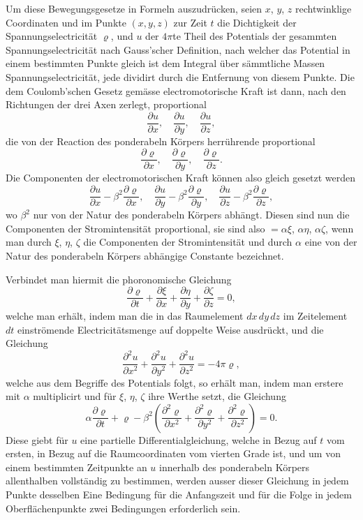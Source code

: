 \documentclass[12pt,a4paper]{article}
\begin{document}
Um diese Bewegungsgesetze in Formeln auszudrücken, seien $x$, $y$, $z$ rechtwinklige Coordinaten und im Punkte $(x, y, z)$ zur Zeit $t$ die Dichtigkeit der Spannungselectricität $\varrho$, und $u$ der $4\pi$te Theil des Potentials der gesammten Spannungselectricität nach Gauss'scher Definition, nach welcher das Potential in einem bestimmten Punkte gleich ist dem Integral über sämmtliche Massen Spannungselectricität, jede dividirt durch die Entfernung von diesem Punkte. Die dem Coulomb'schen Gesetz gemässe electromotorische Kraft ist dann, nach den Richtungen der drei Axen zerlegt, proportional
\[
\frac{\partial u}{\partial x}, \quad \frac{\partial u}{\partial y}, \quad \frac{\partial u}{\partial z},
\]
die von der Reaction des ponderabeln Körpers herrührende proportional
\[
\frac{\partial \varrho}{\partial x}, \quad \frac{\partial \varrho}{\partial y}, \quad \frac{\partial \varrho}{\partial z}.
\]
Die Componenten der electromotorischen Kraft können also gleich gesetzt werden
\[
\frac{\partial u}{\partial x} - \beta^2 \frac{\partial \varrho}{\partial x}, \quad
\frac{\partial u}{\partial y} - \beta^2 \frac{\partial \varrho}{\partial y}, \quad
\frac{\partial u}{\partial z} - \beta^2 \frac{\partial \varrho}{\partial z},
\]
wo $\beta^2$ nur von der Natur des ponderabeln Körpers abhängt. Diesen sind nun die Componenten der Stromintensität proportional, sie sind also $= \alpha \xi$, $\alpha \eta$, $\alpha \zeta$, wenn man durch $\xi$, $\eta$, $\zeta$ die Componenten der Stromintensität und durch $\alpha$ eine von der Natur des ponderabeln Körpers abhängige Constante bezeichnet.

Verbindet man hiermit die phoronomische Gleichung
\[
\frac{\partial \varrho}{\partial t} + \frac{\partial \xi}{\partial x} + \frac{\partial \eta}{\partial y} + \frac{\partial \zeta}{\partial z} = 0,
\]
welche man erhält, indem man die in das Raumelement $dx\,dy\,dz$ im Zeitelement $dt$ einströmende Electricitätsmenge auf doppelte Weise ausdrückt, und die Gleichung
\[
\frac{\partial^2 u}{\partial x^2} + \frac{\partial^2 u}{\partial y^2} + \frac{\partial^2 u}{\partial z^2} = -4\pi \varrho,
\]
welche aus dem Begriffe des Potentials folgt, so erhält man, indem man erstere mit $\alpha$ multiplicirt und für $\xi$, $\eta$, $\zeta$ ihre Werthe setzt, die Gleichung
\[
\alpha \frac{\partial \varrho}{\partial t} + \varrho - \beta^2 \left(\frac{\partial^2 \varrho}{\partial x^2} + \frac{\partial^2 \varrho}{\partial y^2} + \frac{\partial^2 \varrho}{\partial z^2}\right) = 0.
\]
Diese giebt für $u$ eine partielle Differentialgleichung, welche in Bezug auf $t$ vom ersten, in Bezug auf die Raumcoordinaten vom vierten Grade ist, und um von einem bestimmten Zeitpunkte an $u$ innerhalb des ponderabeln Körpers allenthalben vollständig zu bestimmen, werden ausser dieser Gleichung in jedem Punkte desselben Eine Bedingung für die Anfangszeit und für die Folge in jedem Oberflächenpunkte zwei Bedingungen erforderlich sein.
\end{document}
